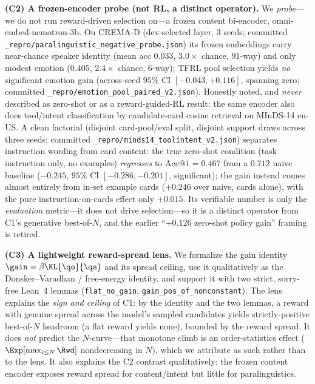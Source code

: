 \textbf{(C2) A frozen-encoder probe (not RL, a distinct operator).} We \emph{probe}---we do not run reward-driven selection on---a frozen content bi-encoder, omni-embed-nemotron-3b. On CREMA-D (dev-selected layer, $3$ seeds; committed \texttt{\_repro/paralinguistic\_negative\_probe.json}) its frozen embeddings carry near-chance speaker identity (mean acc $0.033$, $3.0\times$ chance, $91$-way) and only modest emotion ($0.405$, $2.4\times$ chance, $6$-way); TFRL pool selection yields \emph{no} significant emotion gain (across-seed $95\%$ CI $[-0.043,+0.116]$, spanning zero; committed \texttt{\_repro/emotion\_pool\_paired\_v2.json}). Honestly noted, and \emph{never} described as zero-shot or as a reward-guided-RL result: the same encoder also does tool/intent classification by candidate-card cosine retrieval on MInDS-14 en-US. A clean factorial (disjoint card-pool/eval split, disjoint support draws across three seeds; committed \texttt{\_repro/minds14\_toolintent\_v2.json}) separates instruction wording from card content: the true zero-shot condition (task instruction only, no examples) \emph{regresses} to $\mathrm{Acc@1}=0.467$ from a $0.712$ naive baseline ($-0.245$, $95\%$ CI $[-0.286,-0.201]$, significant); the gain instead comes almost entirely from in-set example cards ($+0.246$ over naive, cards alone), with the pure instruction-on-cards effect only $+0.015$. Its verifiable number is only the \emph{evaluation} metric---it does not drive selection---so it is a distinct operator from C1's generative best-of-$N$, and the earlier ``+0.126 zero-shot policy gain'' framing is retired.

\textbf{(C3) A lightweight reward-spread lens.} We formalize the gain identity $\gain=\beta\KL{\qo}{\qs}$ and its spread ceiling, use it qualitatively as the Donsker--Varadhan / free-energy identity, and support it with two strict, sorry-free Lean~4 lemmas (\texttt{flat\_no\_gain}, \texttt{gain\_pos\_of\_nonconstant}). The lens explains the \emph{sign and ceiling} of C1: by the identity and the two lemmas, a reward with genuine spread across the model's sampled candidates yields strictly-positive best-of-$N$ headroom (a flat reward yields none), bounded by the reward spread. It does \emph{not} predict the $N$-curve---that monotone climb is an order-statistics effect ($\Exp[\max_{i\le N}\Rwd]$ nondecreasing in $N$), which we attribute as such rather than to the lens. It also explains the C2 contrast qualitatively: the frozen content encoder exposes reward spread for content/intent but little for paralinguistics.

